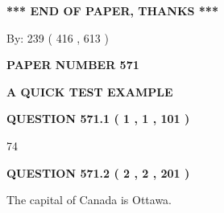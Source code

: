 \documentclass[12pt]{article}
\begin{document}
 
 
 
   
   
 \vspace{0.2in}
 
   
   
   
   
\vspace{1.0in} 
{\textbf{\large{ *** END OF PAPER, THANKS *** }}} 
   
   
\hspace{1.0in} By: 
 239 ( 416 ,  613 )
   
   
   
   
\newpage 
\setcounter{page}{ 
   571001 } 
   
   
   
   
 {\textbf{ \Large{ PAPER NUMBER  571  }}}
   
   
\vspace{0.2in}
   
   
   
   
   
   
 \vspace{0.2in}
{\LARGE {\textbf{ A QUICK TEST EXAMPLE}}}
   
   
  
\vspace{0.2in}
  
{\textbf{\Large{QUESTION
571.1 
 ( 1 , 1 , 101 )
}}}
  
  
 
 
\noindent{}

74
 
 
  
\vspace{0.2in}
  
{\textbf{\Large{QUESTION
571.2 
 ( 2 , 2 , 201 )
}}}
  
  
 
 
\noindent{}
 
 
The capital of Canada is Ottawa.
 
 
 
 
   
   
 \vspace{0.2in}
 
   
   
   
   
\end{document}
